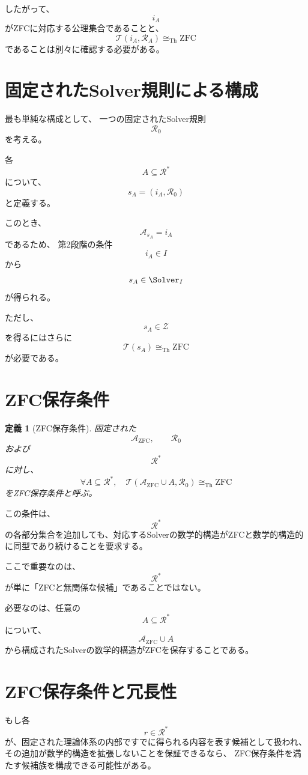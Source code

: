\documentclass[11pt,a4paper]{article}
\newtheorem{definition}{定義}
\begin{document}
したがって、
\[
i_A
\]
がZFCに対応する公理集合であることと、
\[
\mathcal T(i_A,\mathcal R_A)
\cong_{\mathrm{Th}}\mathrm{ZFC}
\]
であることは別々に確認する必要がある。

\section{固定されたSolver規則による構成}

最も単純な構成として、
一つの固定されたSolver規則
\[
\mathcal R_0
\]
を考える。

各
\[
A\subseteq\mathcal R^*
\]
について、
\[
\boxed{
s_A=(i_A,\mathcal R_0)
}
\]
と定義する。

このとき、
\[
\mathcal A_{s_A}=i_A
\]
であるため、
第2段階の条件
\[
i_A\in I
\]
から
\[
s_A\in\Solver_I
\]
が得られる。

ただし、
\[
s_A\in\mathcal Z
\]
を得るにはさらに
\[
\mathcal T(s_A)\cong_{\mathrm{Th}}\mathrm{ZFC}
\]
が必要である。

\section{ZFC保存条件}

\begin{definition}[ZFC保存条件]
固定された
\[
\mathcal A_{\mathrm{ZFC}},
\qquad
\mathcal R_0
\]
および
\[
\mathcal R^*
\]
に対し、
\[
\boxed{
\forall A\subseteq\mathcal R^*,
\quad
\mathcal T(\mathcal A_{\mathrm{ZFC}}\cup A,\mathcal R_0)
\cong_{\mathrm{Th}}\mathrm{ZFC}
}
\]
をZFC保存条件と呼ぶ。
\end{definition}

この条件は、
\[
\mathcal R^*
\]
の各部分集合を追加しても、対応するSolverの数学的構造がZFCと数学的構造的に同型であり続けることを要求する。

ここで重要なのは、
\[
\mathcal R^*
\]
が単に「ZFCと無関係な候補」であることではない。

必要なのは、任意の
\[
A\subseteq\mathcal R^*
\]
について、
\[
\mathcal A_{\mathrm{ZFC}}\cup A
\]
から構成されたSolverの数学的構造がZFCを保存することである。

\section{ZFC保存条件と冗長性}

もし各
\[
r\in\mathcal R^*
\]
が、固定された理論体系の内部ですでに得られる内容を表す候補として扱われ、
その追加が数学的構造を拡張しないことを保証できるなら、
ZFC保存条件を満たす候補族を構成できる可能性がある。
\end{document}
